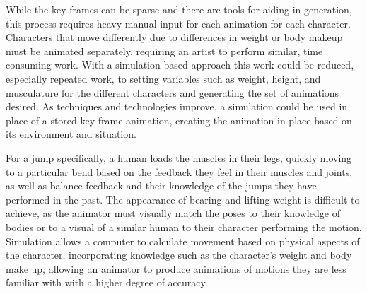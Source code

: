 While the key frames can be sparse and there are tools for aiding in generation, this process requires heavy manual input for each animation for each character.  Characters that move differently due to differences in weight or body makeup must be animated separately, requiring an artist to perform similar, time consuming work.  With a simulation-based approach this work could be reduced, especially repeated work, to setting variables such as weight, height, and musculature for the different characters and generating the set of animations desired.  As techniques and technologies improve, a simulation could be used in place of a stored key frame animation, creating the animation in place based on its environment and situation.

For a jump specifically, a human loads the muscles in their legs, quickly moving to a particular bend based on the feedback they feel in their muscles and joints, as well as balance feedback and their knowledge of the jumps they have performed in the past.  The appearance of bearing and lifting weight is difficult to achieve, as the animator must visually match the poses to their knowledge of bodies or to a visual of a similar human to their character performing the motion.  Simulation allows a computer to calculate movement based on physical aspects of the character, incorporating knowledge such as the character's weight and body make up, allowing an animator to produce animations of motions they are less familiar with with a higher degree of accuracy.


